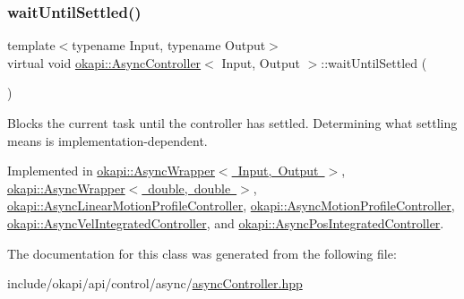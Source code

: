 \subsubsection{\texorpdfstring{waitUntilSettled()}{waitUntilSettled()}}
{\footnotesize\ttfamily template$<$typename Input, typename Output$>$ \\
virtual void \mbox{\hyperlink{classokapi_1_1AsyncController}{okapi\+::\+Async\+Controller}}$<$ Input, Output $>$\+::wait\+Until\+Settled (\begin{DoxyParamCaption}{ }\end{DoxyParamCaption})\hspace{0.3cm}{\ttfamily [pure virtual]}}

Blocks the current task until the controller has settled. Determining what settling means is implementation-\/dependent. 

Implemented in \mbox{\hyperlink{classokapi_1_1AsyncWrapper_a23435c257ac2d6df59ab5d96408e608a}{okapi\+::\+Async\+Wrapper$<$ Input, Output $>$}}, \mbox{\hyperlink{classokapi_1_1AsyncWrapper_a23435c257ac2d6df59ab5d96408e608a}{okapi\+::\+Async\+Wrapper$<$ double, double $>$}}, \mbox{\hyperlink{classokapi_1_1AsyncLinearMotionProfileController_ad2609e435baad67b73b86b48730fdc9c}{okapi\+::\+Async\+Linear\+Motion\+Profile\+Controller}}, \mbox{\hyperlink{classokapi_1_1AsyncMotionProfileController_a0b08d2f39d786739a734c50523db1eb2}{okapi\+::\+Async\+Motion\+Profile\+Controller}}, \mbox{\hyperlink{classokapi_1_1AsyncVelIntegratedController_aa1a838d836496ca5565c1d8379c2897a}{okapi\+::\+Async\+Vel\+Integrated\+Controller}}, and \mbox{\hyperlink{classokapi_1_1AsyncPosIntegratedController_a9f03807433a02bcbee583c1d85eaf55a}{okapi\+::\+Async\+Pos\+Integrated\+Controller}}.



The documentation for this class was generated from the following file\+:\begin{DoxyCompactItemize}
\item 
include/okapi/api/control/async/\mbox{\hyperlink{asyncController_8hpp}{async\+Controller.\+hpp}}\end{DoxyCompactItemize}
